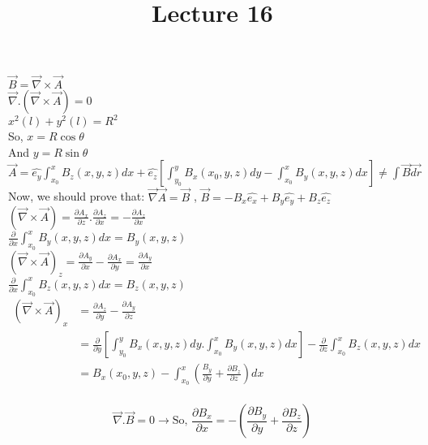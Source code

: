 \documentclass{article}
\begin{document}
\title{Lecture 16}
\maketitle

$\vec{B}=\vec{\nabla}\times\vec{A}$\\
$\vec{\nabla}.(\vec{\nabla}\times\vec{A})=0$\\
$x^{2}(l)+y^{2}(l)=R^{2}$\\
So, $x=R \cos \theta$\\
And $y=R\sin\theta$\\

$\vec{A}=\hat{e_{y}}\int_{x_{0}}^{x}B_{z}(x,y,z)dx+\hat{e_{z}}\left[\int_{y_{0}}^{y}B_{x}(x_{0},y,z)dy-\int_{x_{0}}^{x}B_{y}(x,y,z)dx\right] \neq \int\vec{B}\vec{dr}$\\

Now, we should prove that:
$\vec{\nabla}\vec{A}=\vec{B}$ , $\vec{B}=-B_{x}\hat{e_{x}}+B_{y}\hat{e_{y}}+B_{z}\hat{e_{z}}$\\

$(\vec{\nabla}\times \vec{A})=\frac{\partial A_{x}}{\partial z}.\frac{\partial A_{z}}{\partial x}=-\frac{\partial A_{z}}{\partial x}$\\

$\frac{\partial}{\partial x}\int_{x_{0}}^{x}B_{y}(x,y,z)dx=B_{y}(x,y,z)$\\

$(\vec{\nabla}\times\vec{A})_{z}=\frac{\partial A_{y}}{\partial x}-\frac{\partial A_{x}}{\partial y}=\frac{\partial A_{y}}{\partial x}$\\

$\frac{\partial}{\partial x}\int_{x_{0}}^{x}B_{z}(x,y,z)dx=B_{z}(x,y,z)$\\

\begin{align*}
(\vec{\nabla}\times\vec{A})_{x} &=\frac{\partial A_{z}}{\partial y}-\frac{\partial A_{y}}{\partial z}\\
&=\frac{\partial}{\partial y}\left[\int_{y_{0}}^{y}B_{x}(x,y,z)dy.\int_{x_{0}}^{x}B_{y}(x,y,z)dx\right]-\frac{\partial}{\partial z}\int_{x_{0}}^{x}B_{z}(x,y,z)dx\\
&= B_{x}(x_{0},y,z)-\int_{x_{0}}^{x}\left(\frac{B_{y}}{\partial y}+\frac{\partial B_{z}}{\partial z}\right)dx\\
\end{align*}
\newpage

$$\vec{\nabla}.\vec{B}=0 \rightarrow \mbox{So, } \frac{\partial B_{x}}{\partial x}=-\left(\frac{\partial B_{y}}{\partial y}+\frac{\partial B_{z}}{\partial z}\right)$$\\
\end{document}
